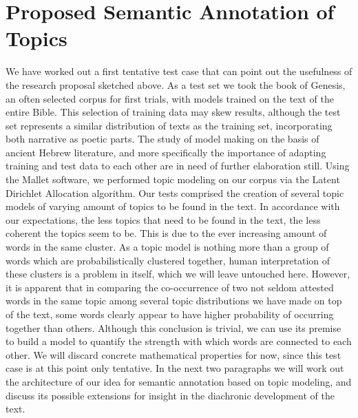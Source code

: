 \documentclass[10pt,a4paper]{article}
\begin{document}
\section{Proposed Semantic Annotation of Topics}
We have worked out a first tentative test case that can point out the usefulness of the research proposal sketched above. As a test set we took the book of Genesis, an often selected corpus for first trials, with models trained on the text of the entire Bible. This selection of training data may skew results, although the test set represents a similar distribution of texts as the training set, incorporating both narrative as poetic parts. The study of model making on the basis of ancient Hebrew literature, and more specifically the importance of adapting training and test data to each other are in need of further elaboration still. Using the Mallet software, we performed topic modeling on our corpus via the Latent Dirichlet Allocation algorithm. Our tests comprised the creation of several topic models of varying amount of topics to be found in the text. In accordance with our expectations, the less topics that need to be found in the text, the less coherent the topics seem to be. This is due to the ever increasing amount of words in the same cluster. As a topic model is nothing more than a group of words which are probabilistically clustered together, human interpretation of these clusters is a problem in itself, which we will leave untouched here. However, it is apparent that in comparing the co-occurrence of two not seldom attested words in the same topic among several topic distributions we have made on top of the text, some words clearly appear to have higher probability of occurring together than others. Although this conclusion is trivial, we can use its premise to build a model to quantify the strength with which words are connected to each other. We will discard concrete mathematical properties for now, since this test case is at this point only tentative. In the next two paragraphs we will work out the architecture of our idea for semantic annotation based on topic modeling, and discuss its possible extensions for insight in the diachronic development of the text.
\end{document}
